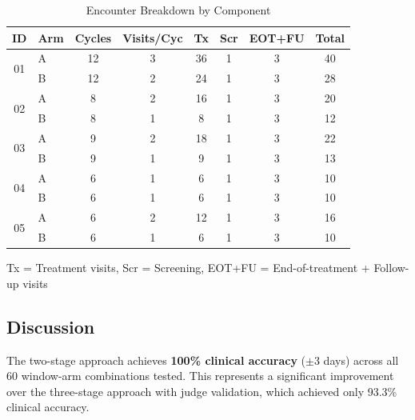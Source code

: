 \begin{table}[htbp]
\centering
\caption{Encounter Breakdown by Component}
\label{tab:encounter_breakdown}
\begin{tabular}{clcccccc}
\toprule
\textbf{ID} & \textbf{Arm} & \textbf{Cycles} & \textbf{Visits/Cyc} & \textbf{Tx} & \textbf{Scr} & \textbf{EOT+FU} & \textbf{Total} \\
\midrule
\multirow{2}{*}{01} & A & 12 & 3 & 36 & 1 & 3 & 40 \\
 & B & 12 & 2 & 24 & 1 & 3 & 28 \\
\midrule
\multirow{2}{*}{02} & A & 8 & 2 & 16 & 1 & 3 & 20 \\
 & B & 8 & 1 & 8 & 1 & 3 & 12 \\
\midrule
\multirow{2}{*}{03} & A & 9 & 2 & 18 & 1 & 3 & 22 \\
 & B & 9 & 1 & 9 & 1 & 3 & 13 \\
\midrule
\multirow{2}{*}{04} & A & 6 & 1 & 6 & 1 & 3 & 10 \\
 & B & 6 & 1 & 6 & 1 & 3 & 10 \\
\midrule
\multirow{2}{*}{05} & A & 6 & 2 & 12 & 1 & 3 & 16 \\
 & B & 6 & 1 & 6 & 1 & 3 & 10 \\
\bottomrule
\end{tabular}
\begin{tablenotes}
\small
\item Tx = Treatment visits, Scr = Screening, EOT+FU = End-of-treatment + Follow-up visits
\end{tablenotes}
\end{table}


\subsection{Discussion}

The two-stage approach achieves \textbf{100\% clinical accuracy} ($\pm$3 days) across all 60 window-arm combinations tested. This represents a significant improvement over the three-stage approach with judge validation, which achieved only 93.3\% clinical accuracy.

